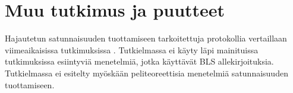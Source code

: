  \section{Muu tutkimus ja puutteet}
 
 Hajautetun satunnaisuuden tuottamiseen tarkoitettuja protokollia vertaillaan viimeaikaisissa tutkimuksissa \cite{bhat2021randpiper, bhat2022optrand, schindler_hydrand_2020}. Tutkielmassa ei käyty läpi mainituissa tutkimuksissa esiintyviä menetelmiä, jotka käyttävät BLS \cite{boneh2001short} allekirjoituksia. Tutkielmassa ei esitelty myöskään peliteoreettisia menetelmiä satunnaisuuden tuottamiseen.

